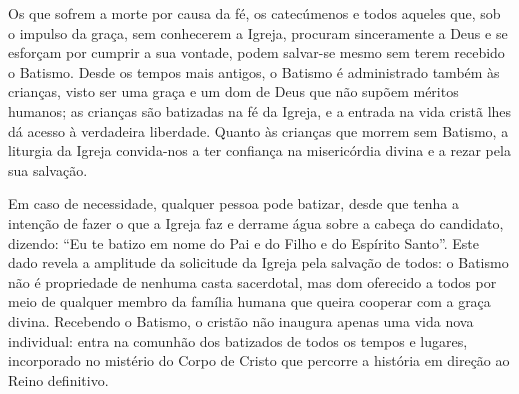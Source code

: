 Os que sofrem a morte por causa da fé, os catecúmenos e todos aqueles que, sob o impulso da graça, sem conhecerem a Igreja, procuram sinceramente a Deus e se esforçam por cumprir a sua vontade, podem salvar-se mesmo sem terem recebido o Batismo. Desde os tempos mais antigos, o Batismo é administrado também às crianças, visto ser uma graça e um dom de Deus que não supõem méritos humanos; as crianças são batizadas na fé da Igreja, e a entrada na vida cristã lhes dá acesso à verdadeira liberdade. Quanto às crianças que morrem sem Batismo, a liturgia da Igreja convida-nos a ter confiança na misericórdia divina e a rezar pela sua salvação.

Em caso de necessidade, qualquer pessoa pode batizar, desde que tenha a intenção de fazer o que a Igreja faz e derrame água sobre a cabeça do candidato, dizendo: ``Eu te batizo em nome do Pai e do Filho e do Espírito Santo''. Este dado revela a amplitude da solicitude da Igreja pela salvação de todos: o Batismo não é propriedade de nenhuma casta sacerdotal, mas dom oferecido a todos por meio de qualquer membro da família humana que queira cooperar com a graça divina. Recebendo o Batismo, o cristão não inaugura apenas uma vida nova individual: entra na comunhão dos batizados de todos os tempos e lugares, incorporado no mistério do Corpo de Cristo que percorre a história em direção ao Reino definitivo.
